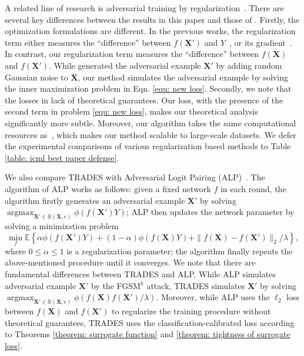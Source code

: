 \documentclass[11pt]{article}
\newcommand{\X}{\bm{X}}
\newcommand{\0}{\mathbf{0}}
\newcommand{\1}{\mathbf{1}}
\newcommand{\bbB}{\mathbb{B}}
\newcommand{\bbE}{\mathbb{E}}
\DeclareMathOperator*{\argmax}{argmax}
\begin{document}
A related line of research is adversarial training by regularization~\cite{miyato2018virtual,kurakin2016adversarial,ross2017improving,zheng2016improving}. There are several key differences between the results in this paper and those of \cite{kurakin2016adversarial,ross2017improving,zheng2016improving}. Firstly, the optimization formulations are different. In the previous works, the regularization term either measures the ``difference'' between $f(\X')$ and $Y$~\cite{kurakin2016adversarial}, or its gradient~\cite{ross2017improving}. In contrast, our regularization term measures the ``difference'' between $f(\X)$ and $f(\X')$. While \cite{zheng2016improving} generated the adversarial example $\X'$ by adding random Gaussian noise to $\X$, our method simulates the adversarial example by solving the inner maximization problem in Eqn. \eqref{equ: new loss}. Secondly, we note that the losses in \cite{miyato2018virtual,kurakin2016adversarial,ross2017improving,zheng2016improving} lack of theoretical guarantees. Our loss, with the presence of the second term in problem \eqref{equ: new loss}, makes our theoretical analysis significantly more subtle. Moreover, our algorithm takes the same computational resources as~\cite{kurakin2016adversarial}, which makes our method scalable to large-scale datasets. We defer the experimental comparisons of various regularization based methods to Table \ref{table: icml best paper defense}.



\medskip
{} We also compare TRADES with Adversarial Logit Pairing (ALP)~\cite{kannan2018adversarial,engstrom2018evaluating}. The algorithm of ALP works as follows: given a fixed network $f$ in each round, the algorithm firstly generates an adversarial example $\X'$ by solving
$\argmax_{\X'\in\bbB(\X,\epsilon)} \phi(f(\X')Y)$; ALP then updates the network parameter by solving a minimization problem
\begin{equation*}
\min_f \bbE \left\{\alpha \phi(f(\X')Y)+(1-\alpha)\phi(f(\X)Y)+\|f(\X)-f(\X')\|_{2}/\lambda\right\},
\end{equation*}
where $0\le\alpha\le 1$ is a regularization parameter; the algorithm finally repeats the above-mentioned procedure until it converges.
We note that there are fundamental differences between TRADES and ALP. While ALP simulates adversarial example $\X'$ by the FGSM$^{k}$ attack, TRADES simulates $\X'$ by solving $\argmax_{\X'\in\bbB(\X,\epsilon)} \phi(f(\X)f(\X')/\lambda)$. Moreover, while ALP uses the $\ell_2$ loss between $f(\X)$ and $f(\X')$ to regularize the training procedure without theoretical guarantees, TRADES uses the classification-calibrated loss according to Theorems \ref{theorem: surrogate function} and \ref{theorem: tightness of surrogate loss}.
\end{document}

